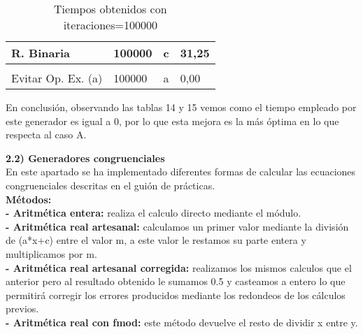 \documentclass{article}
\begin{document}
\begin{table}[h]
\begin{tabular}{llll}
			\multicolumn{1}{|l|}{\multirow{-3}{*}{R. Binaria}}         & \multicolumn{1}{l|}{\multirow{-3}{*}{100000}}            & \multicolumn{1}{l|}{c}                                    & \multicolumn{1}{l|}{31,25}                                       \\ \hline
			&                                                          &                                                           &                                                                  \\ \hline
			\multicolumn{1}{|l|}{Evitar Op. Ex. (a)}                   & \multicolumn{1}{l|}{100000}                              & \multicolumn{1}{l|}{a}                                    & \multicolumn{1}{l|}{0,00}                                        \\ \hline
		\end{tabular}
	\caption{Tiempos obtenidos con iteraciones=100000}
	\end{table}
	
	\newpage

	En conclusión, observando las tablas 14 y 15 vemos como el tiempo empleado por este generador es igual a 0, por lo que esta mejora es la más óptima en lo que respecta al caso A. \\

	\vspace{1cm}
	
	
	\normalsize{\textbf{2.2) Generadores congruenciales}} \\
	
	En este apartado se ha implementado diferentes formas de calcular las ecuaciones congruenciales descritas en el guión de prácticas. \\
	
	\large\textbf{Métodos:} \\
	\normalsize
		\textbf{- Aritmética entera:} realiza el calculo directo mediante el módulo. \\
		\textbf{- Aritmética real artesanal:} calculamos un primer valor mediante la división de (a*x+c) entre el valor m, a este valor le restamos su parte entera y multiplicamos por m. \\
		\textbf{- Aritmética real artesanal corregida:} realizamos los mismos calculos que el anterior pero al resultado obtenido le sumamos 0.5 y casteamos a entero lo que permitirá corregir los errores producidos mediante los redondeos de los cálculos previos. \\
		\textbf{- Aritmética real con fmod:} este método devuelve el resto de dividir x entre y. \\
	
\end{document}
